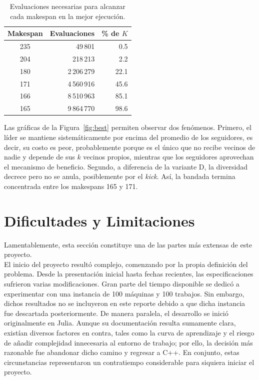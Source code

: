 \documentclass[9pt,a4paper,twocolumn,twoside]{rho-class/rho}
\begin{document}
\begin{table}[h]
    \centering
    \footnotesize
    \caption{Evaluaciones necesarias para alcanzar cada makespan en la mejor ejecución.}
   
    \begin{tabular}{|c|r|r|}
        \hline
        \textbf{Makespan} & \textbf{Evaluaciones} & \textbf{\% de $K$} \\ \hline
        235 & 49\,801     & 0.5  \\ \hline
        204 & 218\,213    & 2.2  \\ \hline
        180 & 2\,206\,279 & 22.1 \\ \hline
        171 & 4\,560\,916 & 45.6 \\ \hline
        166 & 8\,510\,963 & 85.1 \\ \hline
        165 & 9\,864\,770 & 98.6 \\ \hline
    \end{tabular}

     \label{tab:hitos}
\end{table}

Las gráficas de la Figura~\ref{fig:best} permiten observar dos fenómenos. Primero, el líder se mantiene sistemáticamente por encima del promedio de los seguidores, es decir, su costo es peor,
probablemente porque es el único que no recibe vecinos de nadie y depende de sus $k$ vecinos propios, mientras que los seguidores 
aprovechan el mecanismo de beneficio. Segundo, a diferencia de la variante D, la diversidad decrece pero no se anula, posiblemente por el \textit{kick}. Así, la bandada termina concentrada
entre los makespans 165 y 171.\\

\section{Dificultades y Limitaciones}
Lamentablemente, esta sección constituye una de las partes más extensas de este proyecto. \\

El inicio del proyecto resultó complejo, comenzando por la propia definición del problema. Desde la presentación inicial hasta fechas recientes, las
especificaciones sufrieron varias modificaciones. Gran parte del tiempo disponible se dedicó a experimentar con una instancia
de 100 máquinas y 100 trabajos. Sin embargo, dichos resultados no se incluyeron en este reporte debido a que dicha instancia fue descartada posteriormente. De manera
paralela, el desarrollo se inició originalmente en Julia. Aunque su documentación resulta sumamente clara, existían diversos factores en contra, tales como la curva de
aprendizaje y el riesgo de añadir complejidad innecesaria al entorno de trabajo; por ello, la decisión más razonable fue abandonar dicho camino y regresar a C++. En conjunto,
estas circunstancias representaron un contratiempo considerable para siquiera iniciar el proyecto.\\
\end{document}
